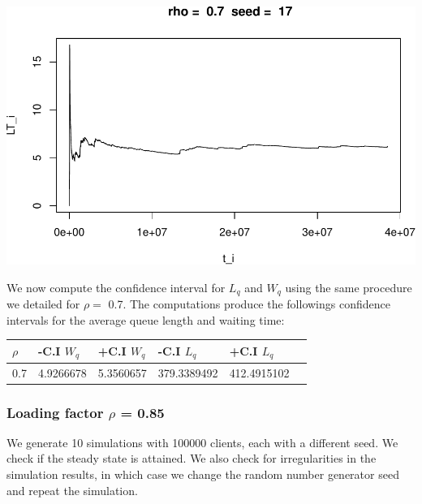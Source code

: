 \documentclass[]{article}
\begin{document}
\includegraphics{003_files/figure-latex/unnamed-chunk-17-10.pdf}

We now compute the confidence interval for \(L_{q}\) and \(W_{q}\) using
the same procedure we detailed for \(\rho =\) 0.7. The computations
produce the followings confidence intervals for the average queue length
and waiting time:

\begin{longtable}[]{@{}llllll@{}}
\toprule
\(\rho\) & -C.I \(W_{q}\) & +C.I \(W_{q}\) & -C.I \(L_{q}\) & +C.I
\(L_{q}\) &\tabularnewline
\midrule
\endhead
0.7 & 4.9266678 & 5.3560657 & 379.3389492 & 412.4915102\tabularnewline
\bottomrule
\end{longtable}

\subsubsection{\texorpdfstring{Loading factor \(\rho\) =
0.85}{Loading factor \textbackslash{}rho = 0.85}}\label{loading-factor-rho-0.85}

We generate 10 simulations with 100000 clients, each with a different
seed. We check if the steady state is attained. We also check for
irregularities in the simulation results, in which case we change the
random number generator seed and repeat the simulation.
\end{document}
